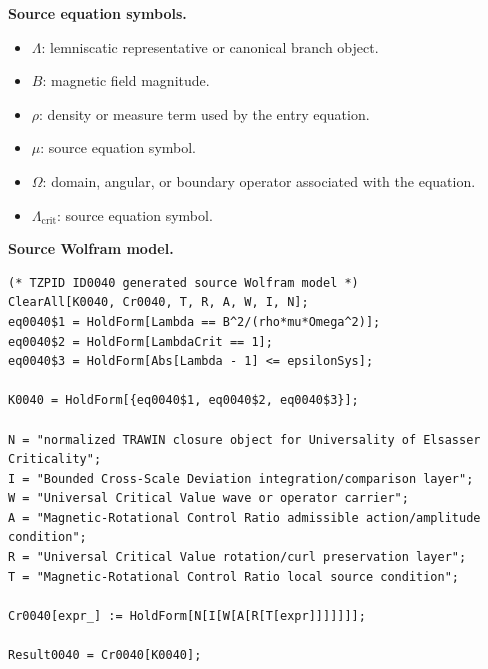 \begin{minipage}[t]{0.49\linewidth}
\begingroup
\small
\raggedright
\textbf{Source equation symbols.}\par
\begin{itemize}[leftmargin=1.35em,itemsep=1pt,topsep=1pt,parsep=0pt]
    \item $\Lambda$: lemniscatic representative or canonical branch object.
    \item $B$: magnetic field magnitude.
    \item $\rho$: density or measure term used by the entry equation.
    \item $\mu$: source equation symbol.
    \item $\Omega$: domain, angular, or boundary operator associated with the equation.
    \item $\Lambda_{\mathrm{crit}}$: source equation symbol.
\end{itemize}
\endgroup
\end{minipage}\hfill
\begin{minipage}[t]{0.47\linewidth}
\begingroup
\scriptsize
\raggedright
\textbf{Source Wolfram model.}\par
\begin{Verbatim}[fontsize=\tiny,breaklines=true,breakanywhere=true]
(* TZPID ID0040 generated source Wolfram model *)
ClearAll[K0040, Cr0040, T, R, A, W, I, N];
eq0040$1 = HoldForm[Lambda == B^2/(rho*mu*Omega^2)];
eq0040$2 = HoldForm[LambdaCrit == 1];
eq0040$3 = HoldForm[Abs[Lambda - 1] <= epsilonSys];

K0040 = HoldForm[{eq0040$1, eq0040$2, eq0040$3}];

N = "normalized TRAWIN closure object for Universality of Elsasser Criticality";
I = "Bounded Cross-Scale Deviation integration/comparison layer";
W = "Universal Critical Value wave or operator carrier";
A = "Magnetic-Rotational Control Ratio admissible action/amplitude condition";
R = "Universal Critical Value rotation/curl preservation layer";
T = "Magnetic-Rotational Control Ratio local source condition";

Cr0040[expr_] := HoldForm[N[I[W[A[R[T[expr]]]]]]];

Result0040 = Cr0040[K0040];
\end{Verbatim}
\endgroup
\end{minipage}

